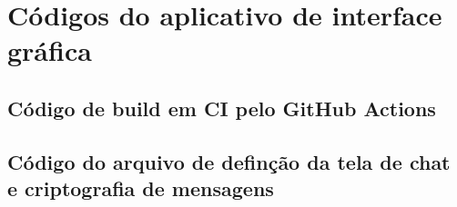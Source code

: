 \section{Códigos do aplicativo de interface gráfica}\label{ch:codigos-app}

\subsection{Código de build em CI pelo GitHub
Actions}\label{ci:codigo-github-actions}


\subsection{Código do arquivo de definção da tela de chat e
criptografia de mensagens}\label{app:codigo-chat}

